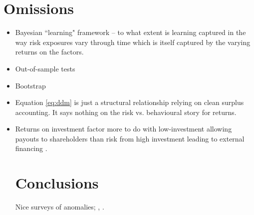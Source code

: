 
\section{Omissions}

\begin{itemize}
  \item Bayesian ``learning" framework \textcite{nagel2013empirical} -- to what extent is
    learning captured in the way risk exposures vary through time which is itself captured
    by the varying returns on the factors.
  \item Out-of-sample tests
  \item Bootstrap
  \item Equation \ref{eq:ddm} is just a structural relationship relying on clean surplus
    accounting. It says nothing on the risk vs. behavioural story for returns.
  \item Returns on investment factor more to do with low-investment allowing payouts to
    shareholders than risk from high investment leading to external financing
    \parencite{fama2008dissecting, daniel2006market, pontiff2008share}.


\section{Conclusions}

Nice surveys of anomalies; \textcite{nagel2013empirical}, \textcite{fama2016dissecting}.


\end{itemize}
